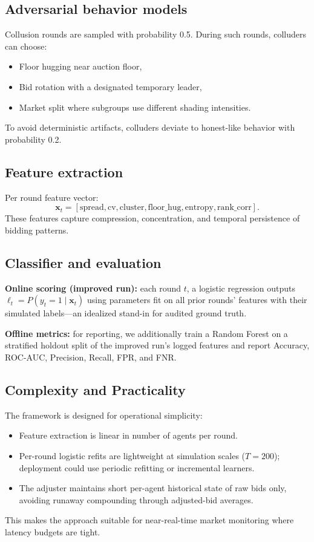 \documentclass[journal]{IEEEtran}
\begin{document}
\subsection{Adversarial behavior models}
Collusion rounds are sampled with probability 0.5. During such rounds, colluders can choose:
\begin{itemize}[leftmargin=*]
    \item Floor hugging near auction floor,
    \item Bid rotation with a designated temporary leader,
    \item Market split where subgroups use different shading intensities.
\end{itemize}
To avoid deterministic artifacts, colluders deviate to honest-like behavior with probability 0.2.

\subsection{Feature extraction}
Per round feature vector:
\begin{equation}
\mathbf{x}_t=[\text{spread},\text{cv},\text{cluster},\text{floor\_hug},\text{entropy},\text{rank\_corr}].
\end{equation}
These features capture compression, concentration, and temporal persistence of bidding patterns.

\subsection{Classifier and evaluation}
\textbf{Online scoring (improved run):} each round $t$, a logistic regression outputs $\ell_t = P(y_t{=}1\mid \mathbf{x}_t)$ using parameters fit on all prior rounds' features with their simulated labels---an idealized stand-in for audited ground truth.

\textbf{Offline metrics:} for reporting, we additionally train a Random Forest on a stratified holdout split of the improved run's logged features and report Accuracy, ROC-AUC, Precision, Recall, FPR, and FNR.

\subsection{Complexity and Practicality}
The framework is designed for operational simplicity:
\begin{itemize}[leftmargin=*]
    \item Feature extraction is linear in number of agents per round.
    \item Per-round logistic refits are lightweight at simulation scales ($T{=}200$); deployment could use periodic refitting or incremental learners.
    \item The adjuster maintains short per-agent historical state of raw bids only, avoiding runaway compounding through adjusted-bid averages.
\end{itemize}
This makes the approach suitable for near-real-time market monitoring where latency budgets are tight.
\end{document}
